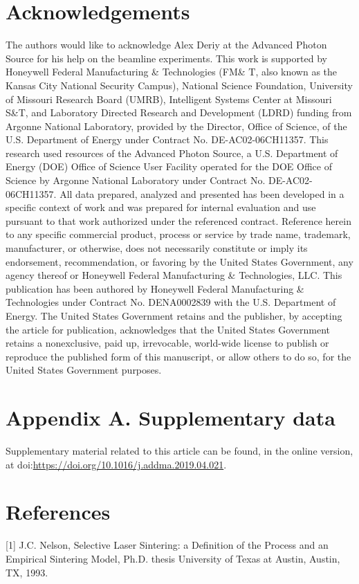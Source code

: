 \documentclass[10pt]{article}
\begin{document}
\section*{Acknowledgements}
The authors would like to acknowledge Alex Deriy at the Advanced Photon Source for his help on the beamline experiments. This work is supported by Honeywell Federal Manufacturing \& Technologies (FM\& $\mathrm{T}$, also known as the Kansas City National Security Campus), National Science Foundation, University of Missouri Research Board (UMRB), Intelligent Systems Center at Missouri S\&T, and Laboratory Directed Research and Development (LDRD) funding from Argonne National Laboratory, provided by the Director, Office of Science, of the U.S. Department of Energy under Contract No. DE-AC02-06CH11357. This research used resources of the Advanced Photon Source, a U.S. Department of Energy (DOE) Office of Science User Facility operated for the DOE Office of Science by Argonne National Laboratory under Contract No. DE-AC02-06CH11357. All data prepared, analyzed and presented has been developed in a specific context of work and was prepared for internal evaluation and use pursuant to that work authorized under the referenced contract. Reference herein to any specific commercial product, process or service by trade name, trademark, manufacturer, or otherwise, does not necessarily constitute or imply its endorsement, recommendation, or favoring by the United States Government, any agency thereof or Honeywell Federal Manufacturing \& Technologies, LLC. This publication has been authored by Honeywell Federal Manufacturing \& Technologies under Contract No. DENA0002839 with the U.S. Department of Energy. The United States Government retains and the publisher, by accepting the article for publication, acknowledges that the United States Government retains a nonexclusive, paid up, irrevocable, world-wide license to publish or reproduce the published form of this manuscript, or allow others to do so, for the United States Government purposes.

\section*{Appendix A. Supplementary data}
Supplementary material related to this article can be found, in the online version, at doi:\href{https://doi.org/10.1016/j.addma.2019.04.021}{https://doi.org/10.1016/j.addma.2019.04.021}.

\section*{References}
[1] J.C. Nelson, Selective Laser Sintering: a Definition of the Process and an Empirical Sintering Model, Ph.D. thesis University of Texas at Austin, Austin, TX, 1993.
\end{document}
